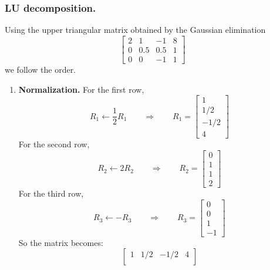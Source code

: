 \documentclass[../../../main.tex]{subfiles}
\begin{document}
\subsubsection{LU decomposition.} 
Using the upper triangular matrix obtained by the Gaussian elimination 
\begin{equation*}
    \begin{bmatrix}
        2 & 1   & -1  & 8 \\
        0 & 0.5 & 0.5 & 1 \\
        0 & 0   & -1  & 1
    \end{bmatrix}
\end{equation*}
we follow the order.
\begin{enumerate}
    \item \textbf{Normalization.}
          For the first row,
          \begin{equation*}
              R_1 \leftarrow \frac{1 }{2 }R_1\qquad\Rightarrow\qquad R_1=
              \begin{bmatrix}
                  1 \\1/2\\-1/2\\4
              \end{bmatrix}
          \end{equation*}
          For the second row,
          \begin{equation*}
              R_2 \leftarrow 2R_2 \qquad\Rightarrow\qquad R_2=
              \begin{bmatrix}
                  0 \\1\\1\\2
              \end{bmatrix}
          \end{equation*}
          For the third row,
          \begin{equation*}
              R_3 \leftarrow -R_3 \qquad\Rightarrow\qquad R_3=
              \begin{bmatrix}
                  0 \\0\\1\\-1
              \end{bmatrix}
          \end{equation*}
          So the matrix becomes:
          \begin{equation*}
              \begin{bmatrix}
                  1 & 1/2 & -1/2 & 4 \\

\end{bmatrix}
\end{equation*}
\end{enumerate}
\end{document}
